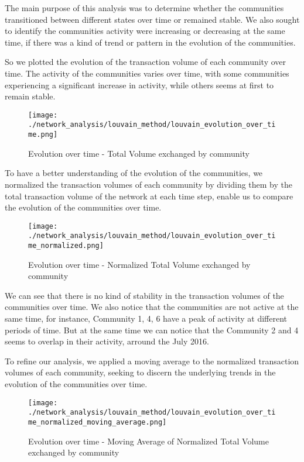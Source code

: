 \documentclass[a4paper, 12pt]{article}
\begin{document}
The main purpose of this analysis was to determine whether the communities transitioned between different states over time or remained stable. 
We also sought to identify the communities activity were increasing or decreasing at the same time, if there was a kind of trend or pattern in the evolution of the communities.

So we plotted the evolution of the transaction volume of each community over time.
The activity of the communities varies over time, with some communities experiencing a significant increase in activity, while others seems at first to remain stable. 

\begin{figure}[h]
    \centering
    \texttt{[image: ./network\_analysis/louvain\_method/louvain\_evolution\_over\_time.png]}
    \caption{Evolution over time - Total Volume exchanged by community}
    \label{fig:louvain_evolution_over_time}
\end{figure}

To have a better understanding of the evolution of the communities, we normalized the transaction volumes of each community by dividing them by the total transaction volume of the network at each time step, enable us to compare the evolution of the communities over time.

\begin{figure}[h]
    \centering
    \texttt{[image: ./network\_analysis/louvain\_method/louvain\_evolution\_over\_time\_normalized.png]}
    \caption{Evolution over time - Normalized Total Volume exchanged by community}
\end{figure}

We can see that there is no kind of stability in the transaction volumes of the communities over time. We also notice that the communities are 
not active at the same time, for instance, Community 1, 4, 6 have a peak of activity at different periods of time.
But at the same time we can notice that the Community 2 and 4 seems to overlap in their activity, arround the July 2016.

To refine our analysis, we applied a moving average to the normalized transaction volumes of each community, 
seeking to discern the underlying trends in the evolution of the communities over time.

\begin{figure}[h]
    \centering
    \texttt{[image: ./network\_analysis/louvain\_method/louvain\_evolution\_over\_time\_normalized\_moving\_average.png]}
    \caption{Evolution over time - Moving Average of Normalized Total Volume exchanged by community}
\end{figure}
\end{document}
